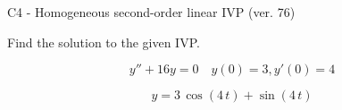 \begin{exercise}
  \begin{exerciseTitle}C4 - Homogeneous second-order linear IVP (ver. 76)\end{exerciseTitle}
  \begin{exerciseStatement}
    
Find the solution to the given IVP.

    
\[y''+16y = 0 \hspace{1em} y(0) = 3 , y'(0) = 4\]

  \end{exerciseStatement}
  \begin{exerciseAnswer}
    
\[y= 3 \, \cos\left(4 \, t\right) + \sin\left(4 \, t\right)\]

  \end{exerciseAnswer}
\end{exercise}